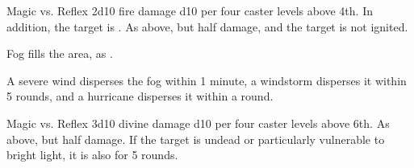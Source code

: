\begin{spellheader}
    \spellrng{\rngclose}
    \spelldur{\durshort}
\end{spellheader}
\begin{spelleffects}
    \begin{spellattack}{Magic vs. Reflex}
        \spellsuccess 2d10 fire damage \add d10 per four caster levels above 4th. In addition, the target is \ignited.
        \spellfailure As above, but half damage, and the target is not ignited.
    \end{spellattack}
\end{spelleffects}
\begin{spellfooter}

\end{spellfooter}

\begin{spellheader}
\end{spellheader}
\begin{spelleffects}
    \spelleffect Fog fills the area, as .
\end{spelleffects}
\begin{spellfooter}
    \spellnotes \fogspellnotes A severe wind disperses the fog within 1 minute, a windstorm disperses it within 5 rounds, and a hurricane disperses it within a round.
\end{spellfooter}

\begin{spellheader}
    \spellrng{\rngclose}
\end{spellheader}
\begin{spelleffects}
    \begin{spellattack}{Magic vs. Reflex}
        \spellsuccess 3d10 divine damage \add d10 per four caster levels above 6th.
        \spellfailure As above, but half damage.
        \spelleffect If the target is undead or particularly vulnerable to bright light, it is also \dazzled for 5 rounds.
    \end{spellattack}
\end{spelleffects}
\begin{spellfooter}

\end{spellfooter}

